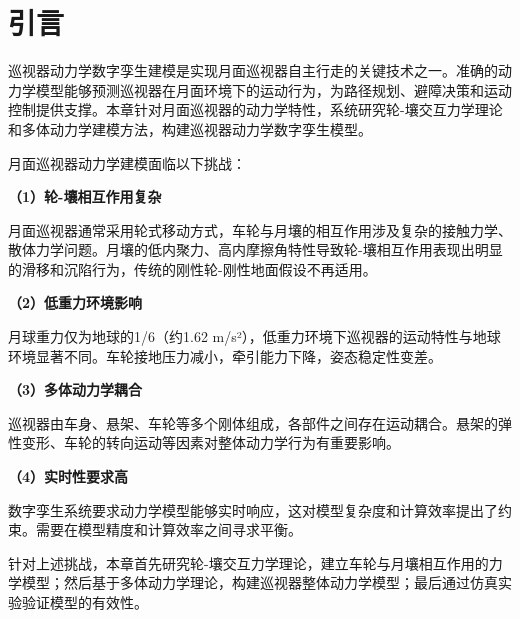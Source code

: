 \section{引言}
\label{sec:ch4_intro}

巡视器动力学数字孪生建模是实现月面巡视器自主行走的关键技术之一。准确的动力学模型能够预测巡视器在月面环境下的运动行为，为路径规划、避障决策和运动控制提供支撑。本章针对月面巡视器的动力学特性，系统研究轮-壤交互力学理论和多体动力学建模方法，构建巡视器动力学数字孪生模型。

月面巡视器动力学建模面临以下挑战：

\textbf{（1）轮-壤相互作用复杂}

月面巡视器通常采用轮式移动方式，车轮与月壤的相互作用涉及复杂的接触力学、散体力学问题。月壤的低内聚力、高内摩擦角特性导致轮-壤相互作用表现出明显的滑移和沉陷行为，传统的刚性轮-刚性地面假设不再适用。

\textbf{（2）低重力环境影响}

月球重力仅为地球的1/6（约1.62 m/s²），低重力环境下巡视器的运动特性与地球环境显著不同。车轮接地压力减小，牵引能力下降，姿态稳定性变差。

\textbf{（3）多体动力学耦合}

巡视器由车身、悬架、车轮等多个刚体组成，各部件之间存在运动耦合。悬架的弹性变形、车轮的转向运动等因素对整体动力学行为有重要影响。

\textbf{（4）实时性要求高}

数字孪生系统要求动力学模型能够实时响应，这对模型复杂度和计算效率提出了约束。需要在模型精度和计算效率之间寻求平衡。

针对上述挑战，本章首先研究轮-壤交互力学理论，建立车轮与月壤相互作用的力学模型；然后基于多体动力学理论，构建巡视器整体动力学模型；最后通过仿真实验验证模型的有效性。
